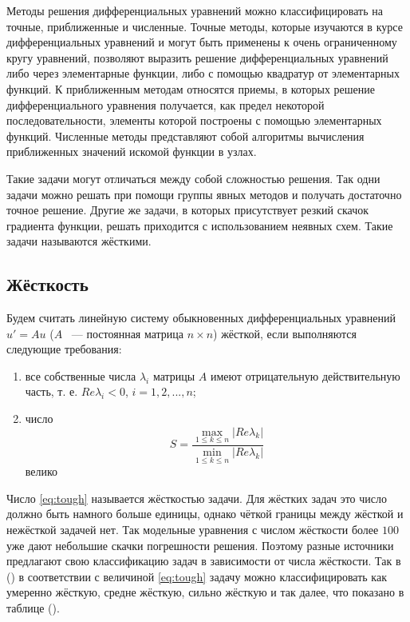 Методы решения дифференциальных уравнений можно классифицировать на точные, приближенные и численные. Точные методы, которые изучаются
в курсе дифференциальных уравнений и могут быть применены к очень ограниченному кругу уравнений, позволяют выразить решение
дифференциальных уравнений либо через элементарные функции, либо с помощью квадратур от элементарных функций. К приближенным методам
относятся приемы, в которых решение дифференциального уравнения получается, как предел некоторой последовательности, элементы которой
построены с помощью элементарных функций. Численные методы представляют собой алгоритмы вычисления приближенных значений искомой
функции в узлах. %

Такие задачи могут отличаться между собой сложностью решения. Так одни задачи можно решать при помощи группы явных методов и получать
достаточно точное решение. Другие же задачи, в которых присутствует резкий скачок градиента функции, решать приходится с использованием
неявных схем. Такие задачи называются жёсткими.

\subsection{Жёсткость}

Будем считать линейную систему обыкновенных дифференциальных уравнений $u' = Au$ ($A$ ~--- постоянная матрица $n \times n$)
жёсткой, если выполняются следующие требования:

\begin{enumerate}
    \item все собственные числа $\lambda_i$ матрицы $A$ имеют отрицательную действительную часть, т. е. $Re\lambda_i < 0$, 
    $i = 1, 2, ..., n$;
    \item число
        \begin{equation}
            S = \dfrac{\max\limits_{1 \leq k \leq n}|Re\lambda_k|}{\min\limits_{1 \leq k \leq n}|Re\lambda_k|}
            \label{eq:tough}
        \end{equation}
        велико
\end{enumerate}

Число \ref{eq:tough} называется жёсткостью задачи. Для жёстких задач это число должно быть намного больше единицы, однако чёткой
границы между жёсткой и нежёсткой задачей нет. Так
модельные уравнения с числом жёсткости более $100$ уже дают небольшие скачки погрешности решения. Поэтому разные источники
предлагают свою классификацию задач в зависимости от числа жёсткости. Так в () в соответствии с величиной \ref{eq:tough} задачу
можно классифицировать как умеренно жёсткую,
средне жёсткую, сильно жёсткую и так далее, что показано в таблице ().

